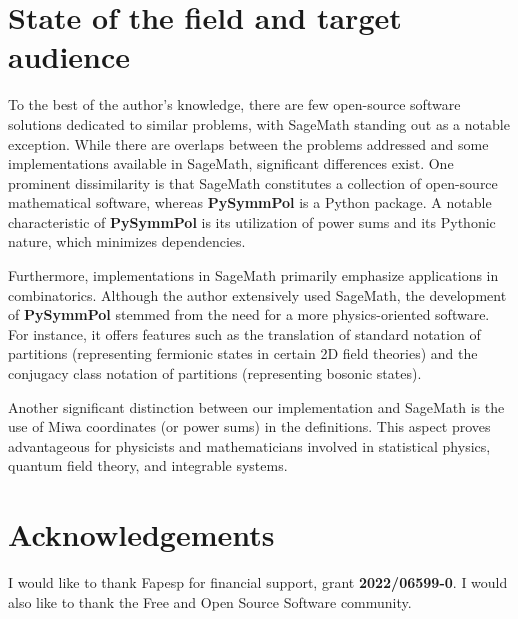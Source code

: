 \documentclass[a4paper,10pt]{amsart}
\begin{document}
\section{State of the field and target audience}

To the best of the author's knowledge, there are few open-source
software solutions dedicated to similar problems, with SageMath
\cite{sagemath} standing out as a notable exception. While there are
overlaps between the problems addressed and some implementations
available in SageMath, significant differences exist. One prominent
dissimilarity is that SageMath constitutes a collection of open-source
mathematical software, whereas \textbf{PySymmPol} is a Python package. A
notable characteristic of \textbf{PySymmPol} is its utilization of power
sums and its Pythonic nature, which minimizes dependencies.

Furthermore, implementations in SageMath primarily emphasize
applications in combinatorics. Although the author extensively used
SageMath, the development of \textbf{PySymmPol} stemmed from the need for a
more physics-oriented software. For instance, it offers features such
as the translation of standard notation of partitions (representing
fermionic states in certain 2D field theories) and the conjugacy class
notation of partitions (representing bosonic states).

Another significant distinction between our implementation and
SageMath is the use of Miwa coordinates (or power sums) in the
definitions. This aspect proves advantageous for physicists and
mathematicians involved in statistical physics, quantum field theory,
and integrable systems.

\section{Acknowledgements}

I would like to thank Fapesp for financial support, grant
\textbf{2022/06599-0}.  I would also like to thank the Free and Open Source
Software community.

\printbibliography
     
\end{document}
